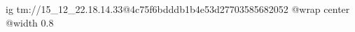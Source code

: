  
 
 
 
 

\qqSecOrig


\ifcmt
  ig tm://15_12_22.18.14.33@4c75f6bdddb1b4e53d27703585682052
  @wrap center
  @width 0.8
\fi

